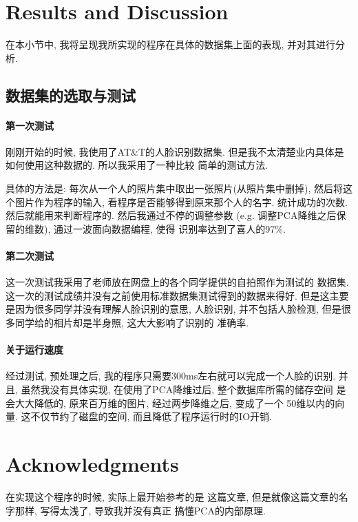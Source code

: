 \documentclass[fleqn,10pt]{SelfArx} %
\begin{document}
\section{Results and Discussion}

在本小节中, 我将呈现我所实现的程序在具体的数据集上面的表现, 
并对其进行分析.
\subsection{数据集的选取与测试}
	\paragraph{第一次测试}
		刚刚开始的时候, 我使用了AT\&T的人脸识别数据集\cite{database}.
		但是我不太清楚业内具体是如何使用这种数据的. 所以我采用了一种比较
		简单的测试方法. 

		具体的方法是: 每次从一个人的照片集中取出一张照片(从照片集中删掉),
		然后将这个图片作为程序的输入, 看程序是否能够得到原来那个人的名字.
		统计成功的次数. 然后就能用来判断程序的. 然后我通过不停的调整参数
		(e.g. 调整PCA降维之后保留的维数), 通过一波面向数据编程, 使得
		识别率达到了喜人的97\%.

	\paragraph{第二次测试}
		这一次测试我采用了老师放在网盘上的各个同学提供的自拍照作为测试的
		数据集. 这一次的测试成绩并没有之前使用标准数据集测试得到的数据来得好.
		但是这主要是因为很多同学并没有理解人脸识别的意思, 人脸识别,
		并不包括人脸检测, 但是很多同学给的相片却是半身照, 这大大影响了识别的
		准确率.

	\paragraph{关于运行速度}
		经过测试, 预处理之后, 我的程序只需要300ms左右就可以完成一个人脸的识别.
		并且, 虽然我没有具体实现, 在使用了PCA降维过后, 整个数据库所需的储存空间
		是会大大降低的, 原来百万维的图片, 经过两步降维之后, 变成了一个
		50维以内的向量. 这不仅节约了磁盘的空间, 而且降低了程序运行时的IO开销.

\section*{Acknowledgments} %
在实现这个程序的时候, 实际上最开始参考的是\cite{tutorial:PCA}
这篇文章, 但是就像这篇文章的名字那样, 写得太浅了, 导致我并没有真正
搞懂PCA的内部原理.
\end{document}
